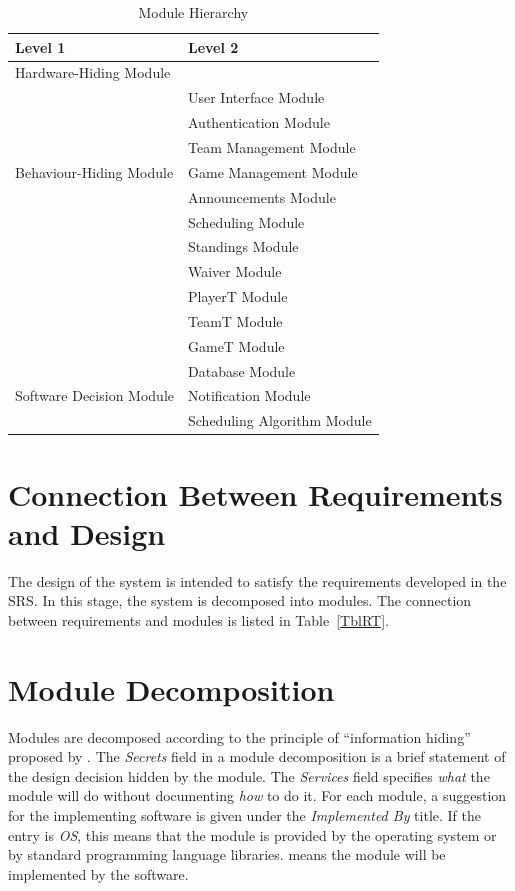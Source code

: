 \documentclass[12pt, titlepage]{article}
\begin{document}
\begin{table}[h!]
\centering
\begin{tabular}{p{} p{}}
\toprule
\textbf{Level 1} & \textbf{Level 2}\\
\midrule

{Hardware-Hiding Module} & ~ \\
\midrule

\multirow{7}{0.3\textwidth}{Behaviour-Hiding Module} & User Interface Module\\
& Authentication Module\\
& Team Management Module\\
& Game Management Module\\
& Announcements Module\\
& Scheduling Module\\
& Standings Module\\
& Waiver Module\\
& PlayerT Module\\
& TeamT Module\\
& GameT Module\\
\midrule

\multirow{3}{0.3\textwidth}{Software Decision Module} & {Database Module}\\
& {Notification Module}\\
& {Scheduling Algorithm Module}\\
\bottomrule

\end{tabular}
\caption{Module Hierarchy}
\label{TblMH}
\end{table}

\section{Connection Between Requirements and Design} \label{SecConnection}

The design of the system is intended to satisfy the requirements developed in
the SRS. In this stage, the system is decomposed into modules. The connection
between requirements and modules is listed in Table~\ref{TblRT}.

\section{Module Decomposition} \label{SecMD}

Modules are decomposed according to the principle of ``information hiding''
proposed by \citet{ParnasEtAl1984}. The \emph{Secrets} field in a module
decomposition is a brief statement of the design decision hidden by the
module. The \emph{Services} field specifies \emph{what} the module will do
without documenting \emph{how} to do it. For each module, a suggestion for the
implementing software is given under the \emph{Implemented By} title. If the
entry is \emph{OS}, this means that the module is provided by the operating
system or by standard programming language libraries.  \emph{\progname{}} means the
module will be implemented by the \progname{} software.
\end{document}
